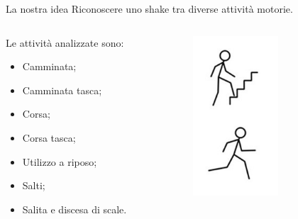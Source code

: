 \documentclass{beamer}
\begin{document}
\begin{frame}{La nostra idea}
Riconoscere uno shake tra diverse attività motorie.\\
\smallskip
\begin{columns}[T] %
\begin{column}{.48\textwidth}
Le attività analizzate sono:
\begin{itemize}
\item Camminata;
\item Camminata tasca;
\item Corsa;
\item Corsa tasca;
\item Utilizzo a riposo;
\item Salti;
\item Salita e discesa di scale.
\end{itemize}
\end{column}%
\hfill%
\begin{column}{.4\textwidth}
\begin{figure}[H]
\includegraphics[width=0.6\textwidth]{./images/attivit.jpg}
\end{figure}
\end{column}%
\end{columns}
\end{frame}
\end{document}
